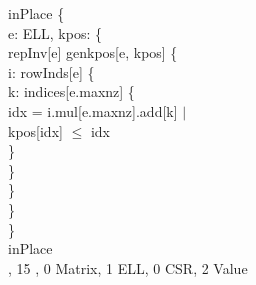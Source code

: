 \begin{myquote}
\Bassert inPlace \{\\
\TA \Ball e: ELL, kpos: \Bseqint \{\\
\TB repInv[e] \Band genkpos[e, kpos] \Bimplies \{\\
\TC \Ball i: rowInds[e] \{\\
\TD \Ball k: indices[e.maxnz] \{\\
\TE \Blet idx = i.mul[e.maxnz].add[k] $|$\\
\TF kpos[idx] $\leq$ idx\\
\TD \}\\
\TC \}\\
\TB \}\\
\TA \}\\
\}\\
\Bcheck inPlace\\
\TA {} \Bint, 15 \Bseq, 0 Matrix, 1 ELL, 0 CSR, 2 Value
\end{myquote}